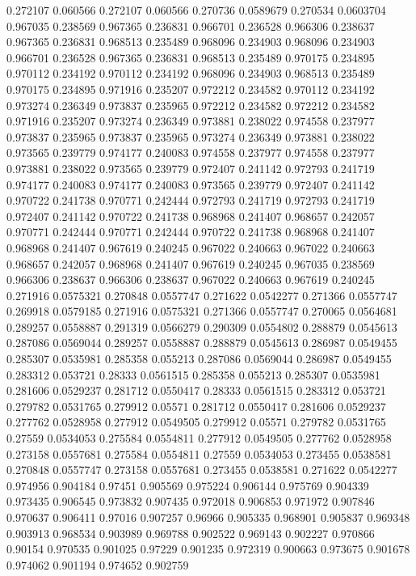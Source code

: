 0.272107 0.060566
0.272107 0.060566
0.270736 0.0589679
0.270534 0.0603704
0.967035 0.238569
0.967365 0.236831
0.966701 0.236528
0.966306 0.238637
0.967365 0.236831
0.968513 0.235489
0.968096 0.234903
0.968096 0.234903
0.966701 0.236528
0.967365 0.236831
0.968513 0.235489
0.970175 0.234895
0.970112 0.234192
0.970112 0.234192
0.968096 0.234903
0.968513 0.235489
0.970175 0.234895
0.971916 0.235207
0.972212 0.234582
0.970112 0.234192
0.973274 0.236349
0.973837 0.235965
0.972212 0.234582
0.972212 0.234582
0.971916 0.235207
0.973274 0.236349
0.973881 0.238022
0.974558 0.237977
0.973837 0.235965
0.973837 0.235965
0.973274 0.236349
0.973881 0.238022
0.973565 0.239779
0.974177 0.240083
0.974558 0.237977
0.974558 0.237977
0.973881 0.238022
0.973565 0.239779
0.972407 0.241142
0.972793 0.241719
0.974177 0.240083
0.974177 0.240083
0.973565 0.239779
0.972407 0.241142
0.970722 0.241738
0.970771 0.242444
0.972793 0.241719
0.972793 0.241719
0.972407 0.241142
0.970722 0.241738
0.968968 0.241407
0.968657 0.242057
0.970771 0.242444
0.970771 0.242444
0.970722 0.241738
0.968968 0.241407
0.968968 0.241407
0.967619 0.240245
0.967022 0.240663
0.967022 0.240663
0.968657 0.242057
0.968968 0.241407
0.967619 0.240245
0.967035 0.238569
0.966306 0.238637
0.966306 0.238637
0.967022 0.240663
0.967619 0.240245
0.271916 0.0575321
0.270848 0.0557747
0.271622 0.0542277
0.271366 0.0557747
0.269918 0.0579185
0.271916 0.0575321
0.271366 0.0557747
0.270065 0.0564681
0.289257 0.0558887
0.291319 0.0566279
0.290309 0.0554802
0.288879 0.0545613
0.287086 0.0569044
0.289257 0.0558887
0.288879 0.0545613
0.286987 0.0549455
0.285307 0.0535981
0.285358 0.055213
0.287086 0.0569044
0.286987 0.0549455
0.283312 0.053721
0.28333 0.0561515
0.285358 0.055213
0.285307 0.0535981
0.281606 0.0529237
0.281712 0.0550417
0.28333 0.0561515
0.283312 0.053721
0.279782 0.0531765
0.279912 0.05571
0.281712 0.0550417
0.281606 0.0529237
0.277762 0.0528958
0.277912 0.0549505
0.279912 0.05571
0.279782 0.0531765
0.27559 0.0534053
0.275584 0.0554811
0.277912 0.0549505
0.277762 0.0528958
0.273158 0.0557681
0.275584 0.0554811
0.27559 0.0534053
0.273455 0.0538581
0.270848 0.0557747
0.273158 0.0557681
0.273455 0.0538581
0.271622 0.0542277
0.974956 0.904184
0.97451 0.905569
0.975224 0.906144
0.975769 0.904339
0.973435 0.906545
0.973832 0.907435
0.972018 0.906853
0.971972 0.907846
0.970637 0.906411
0.97016 0.907257
0.96966 0.905335
0.968901 0.905837
0.969348 0.903913
0.968534 0.903989
0.969788 0.902522
0.969143 0.902227
0.970866 0.90154
0.970535 0.901025
0.97229 0.901235
0.972319 0.900663
0.973675 0.901678
0.974062 0.901194
0.974652 0.902759
